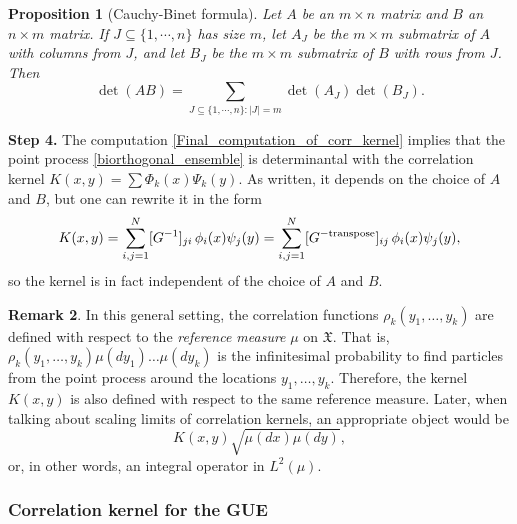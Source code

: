 \documentclass[letterpaper,11pt,oneside,reqno]{amsart}
\numberwithin{equation}{section}
\newtheorem{proposition}{Proposition}[section]
\theoremstyle{definition}
\newtheorem{remark}[proposition]{Remark}
\begin{document}
\begin{proposition}[Cauchy-Binet formula]
	Let $A$ be an $m\times n$ matrix 
	and $B$ an $n\times m$ matrix. 
	If $J\subseteq \{1,\cdots, n\}$ has size $m$, 
	let $A_J$ be the $m\times m$ submatrix of $A$ 
	with columns from $J$, and let $B_J$ be the $m\times m$ submatrix of $B$ with rows from $J$. Then
	\begin{equation*}
	  \det(AB)=\sum_{J\subseteq \{1,\cdots, n\}\colon|J|=m} \det(A_J) \det(B_J).
	\end{equation*}
\end{proposition}

\textbf{Step 4.}
The computation \eqref{Final_computation_of_corr_kernel}
implies that the point process
\eqref{biorthogonal_ensemble} is determinantal with the correlation kernel
$K(x,y)=\sum \Phi_k(x) \Psi_k(y)$. As written, it depends on the choice of $A$ and $B$,
but one can rewrite it in the form
\begin{equation}\label{biorthogonal_ensemble_kernel}
	K(x,y)=\sum_{i,j=1}^N [G^{-1}]_{ji}\, \phi_i(x) \psi_j(y)
	=\sum_{i,j=1}^N [G^{{}-{}\textnormal{transpose}}]_{ij}\, \phi_i(x) \psi_j(y),
\end{equation}
so the kernel is in fact independent of the choice of $A$ and $B$.

\begin{remark}\label{rmk:reference_measure}
	In this general setting, the correlation functions 
	$\rho_k(y_1,\ldots,y_k)$ are defined with respect to the \emph{reference measure}
	$\mu$
	on $\mathfrak{X}$.
	That is,
	$\rho_k(y_1,\ldots,y_k)\mu(dy_1)\ldots\mu(dy_k)$ is the infinitesimal probability
	to find particles from the point process around the locations
	$y_1,\ldots,y_k$.
	Therefore, the kernel $K(x,y)$ is also defined with respect to the same reference measure.
	Later, when talking about scaling limits of correlation kernels, 
	an appropriate object would be 
	\begin{equation}\label{reference_measure_invariant_form}
		K(x,y)\sqrt{\mu(dx)\mu(dy)},
	\end{equation}
	or, in other words, an integral operator in $L^2(\mu)$.
\end{remark}


\subsubsection{Correlation kernel for the GUE} %
\label{ssub:correlation_kernel_for_the_gue}
\end{document}
